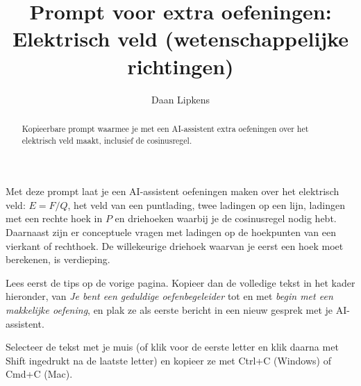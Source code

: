 \documentclass{ximera}
\title{Prompt voor extra oefeningen: Elektrisch veld (wetenschappelijke richtingen)}
\author{Daan Lipkens}
\begin{document}
\begin{abstract}
    Kopieerbare prompt waarmee je met een AI-assistent extra oefeningen over het elektrisch veld maakt, inclusief de cosinusregel.
\end{abstract}
\maketitle

Met deze prompt laat je een AI-assistent oefeningen maken over het elektrisch veld: $E = F/Q$, het veld van een puntlading, twee ladingen op een lijn, ladingen met een rechte hoek in $P$ en driehoeken waarbij je de cosinusregel nodig hebt. Daarnaast zijn er conceptuele vragen met ladingen op de hoekpunten van een vierkant of rechthoek. De willekeurige driehoek waarvan je eerst een hoek moet berekenen, is verdieping.

Lees eerst de tips op de vorige pagina. Kopieer dan de volledige tekst in het kader hieronder, van \textit{Je bent een geduldige oefenbegeleider} tot en met \textit{begin met een makkelijke oefening}, en plak ze als eerste bericht in een nieuw gesprek met je AI-assistent.

\begin{onlineOnly}
    Selecteer de tekst met je muis (of klik voor de eerste letter en klik daarna met Shift ingedrukt na de laatste letter) en kopieer ze met Ctrl+C (Windows) of Cmd+C (Mac).
\end{onlineOnly}
\end{document}
